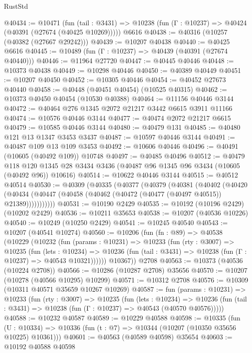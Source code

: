 \begin{lexlean}{RustStd}
\begin{coremodule}
@40434 := @10471
    (fun (tail : @3431) => @10238 (fun (Γ : @10237) => @40424 (@40391 (@27674 (@40425 @10269)))))
    @6616
@40438 := @40316 (@10257 (@40382 (@27667 @29242)))
@40439 := @10207 @40438
@40440 := @40425 @6616
@40445 := @10489 (fun (Γ : @10237) => @40439 (@40391 (@27674 @40440)))
@40446 := @11964 @27720
@40447 := @40445 @40446
@40448 := @10373 @40438
@40449 := @10298 @40446
@40450 := @40389 @40449
@40451 := @10207 @40450
@40452 := @10305 @40446
@40454 := @40452 @27673 @40440
@40458 := @40448 (@40451 @40454) (@10525 @40315)
@40462 := @10373 @40450 @40454 (@10530 @40388)
@40464 := @11156 @40446 @3144
@40472 := @40464 @276 @1345 @2072 @21217 @3442 @6615 @3911 @11166
@40474 := @10576 @40446 @3144
@40477 := @40474 @2072 @21217 @6615
@40479 := @10585 @40446 @3144
@40480 := @40479 @131
@40485 := @40480 @121 @13 @1347 @3453 @3437
@40487 := @10597 @40446 @3144
@40491 := @40487 @109 @13 @109 @3453
@40492 := @10606 @40446
@40496 := @40491 (@10605 (@40492 @109)) @10748
@40497 := @40485 @40496
@40512 := @40479
    @118
    @120
    @1345
    @28
    @3434
    @3436
    (@40487 @96 @1345 @96 @3434 (@10605 (@40492 @96)) @10616)
@40514 := @10622 @40446 @3144
@40515 := @40512 @40514
@40530 := @40309
    (@40335
      (@40377
        (@40379
          (@40381
            (@40402
              (@40420
                (@40434 (@40447 (@40458 (@40462 (@40472 (@40477 (@40497 @40515)) @21389)))))))))))
@40531 := @10190 @2429
@40535 := @10192 (@10196 @2429) (@10202 @2429)
@40536 := @10211 @35653
@40538 := @10207 (@40536 @10226)
@40540 := @10249 (@10250 @2429)
@40541 := @10245 @40540
@40543 := @10207 (@40541 @10274)
@40560 := @10206
    (fun (fn : @89) =>
    @40538
      (@10229
        (@10232
          (fun (params : @10231) =>
          @10233
            (fun (rty : @3007) =>
            @10235
              (fun (lets : @10234) =>
              @10236 (fun (tail : @3431) => @10238 (fun (Γ : @10237) => @40543 @10321))))))
        @10367))
    @2708
@40563 := @10373 (@40536 (@10224 @2708))
@40566 := @10286 (@10287 @2708) @35656
@40570 := @10207 (@10278 (@40566 @10295) @10299)
@40571 := @10312 @2708
@40576 := @10309 (@10311 @40571 @35659 @10267 @10269)
@40587 := fun (params : @10231) =>
  @10233
    (fun (rty : @3007) =>
    @10235
      (fun (lets : @10234) =>
      @10236 (fun (tail : @3431) => @10238 (fun (Γ : @10237) => @40543 (@40570 @40576)))))
@40588 := @10232 @40587
@40589 := @10229 @40588
@40598 := @10335
    (fun (U : @10334) => @10336 (fun (t : @7) => @10344 (@10207 (@10350 @35656 @10225) @10361)))
@40601 := @40563 (@40589 @40598) @35654
@40603 := @10192 @40588 @40598

\end{coremodule}
\end{lexlean}
